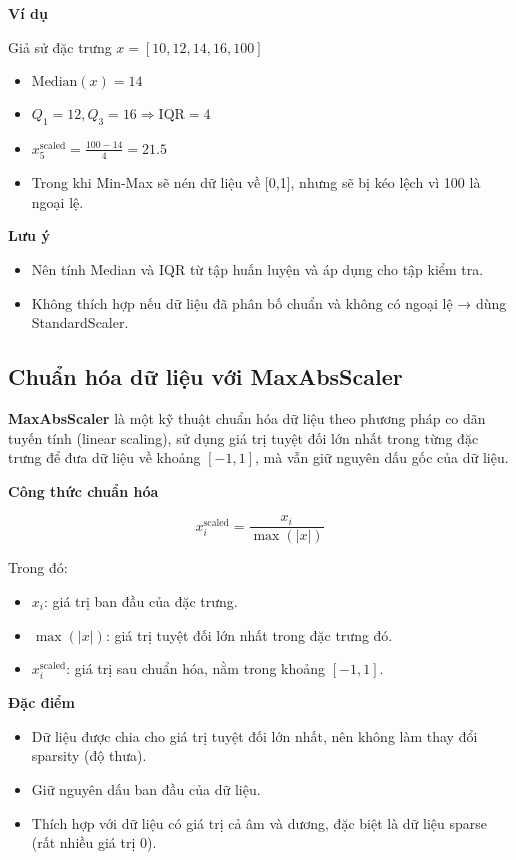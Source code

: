 \textbf{Ví dụ}

Giả sử đặc trưng \( x = [10, 12, 14, 16, 100] \)

\begin{itemize}
    \item \( \text{Median}(x) = 14 \)
    \item \( Q_1 = 12, Q_3 = 16 \Rightarrow \text{IQR} = 4 \)
    \item \( x_5^{\text{scaled}} = \frac{100 - 14}{4} = 21.5 \)
    \item Trong khi Min-Max sẽ nén dữ liệu về [0,1], nhưng sẽ bị kéo lệch vì 100 là ngoại lệ.
\end{itemize}

\textbf{Lưu ý}

\begin{itemize}
    \item Nên tính Median và IQR từ tập huấn luyện và áp dụng cho tập kiểm tra.
    \item Không thích hợp nếu dữ liệu đã phân bố chuẩn và không có ngoại lệ → dùng StandardScaler.
\end{itemize}

\subsection{Chuẩn hóa dữ liệu với MaxAbsScaler}
\label{scaler:maxabs}

\textbf{MaxAbsScaler} là một kỹ thuật chuẩn hóa dữ liệu theo phương pháp co dãn tuyến tính (linear scaling), sử dụng giá trị tuyệt đối lớn nhất trong từng đặc trưng để đưa dữ liệu về khoảng \([-1, 1]\), mà vẫn giữ nguyên dấu gốc của dữ liệu.

\textbf{Công thức chuẩn hóa}

\[
x_i^{\text{scaled}} = \frac{x_i}{\max \left( |x| \right)}
\]

Trong đó:
\begin{itemize}
    \item \( x_i \): giá trị ban đầu của đặc trưng.
    \item \( \max(|x|) \): giá trị tuyệt đối lớn nhất trong đặc trưng đó.
    \item \( x_i^{\text{scaled}} \): giá trị sau chuẩn hóa, nằm trong khoảng \( [-1, 1] \).
\end{itemize}

\textbf{Đặc điểm}

\begin{itemize}
    \item Dữ liệu được chia cho giá trị tuyệt đối lớn nhất, nên không làm thay đổi sparsity (độ thưa).
    \item Giữ nguyên dấu ban đầu của dữ liệu.
    \item Thích hợp với dữ liệu có giá trị cả âm và dương, đặc biệt là dữ liệu sparse (rất nhiều giá trị 0).
\end{itemize}

